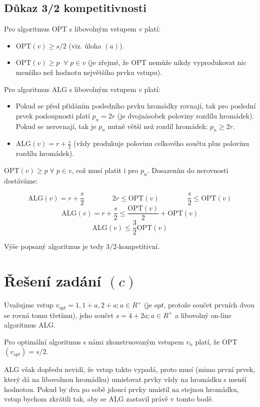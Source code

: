 \documentclass[a4paper, 12pt]{article}
\begin{document}
  \subsection{Důkaz 3/2 kompetitivnosti}
  Pro algoritmus OPT s libovolným vstupem $v$ platí:
  \begin{itemize}
    \item OPT$(v) \ge s/2$ (viz. úloha $(a)$).
    \item OPT$(v) \ge p \; \; \forall \; p \in v$ (je zřejmé, že OPT nemůže nikdy vyprodukovat nic menšího než hodnotu největšího prvku vstupu).
  \end{itemize}

  Pro algoritmus ALG s libovolným vstupem $v$ platí:
  \begin{itemize}
    \item Pokud se před přidáním posledního prvku hromádky rovnají, tak pro poslední prvek posloupnosti platí $p_n=2r$ (je dvojnásobek poloviny rozdílu hromádek). Pokud se nerovnají, tak je $p_n$ nutně větší než rozdíl hromádek: $p_n \ge 2r$.
    \item ALG$(v)=r+\frac{s}{2}$ (vždy produkuje polovinu celkového součtu plus polovinu rozdílu hromádek).
  \end{itemize}

  OPT$(v) \ge p \; \forall \; p \in v$, což musí platit i pro $p_n$. Dosazením do nerovnosti dostáváme:

  $$\text{ALG}(v)=r+\frac{s}{2} \qquad \qquad 2r \le \text{OPT}(v) \qquad \qquad \frac{s}{2} \le \text{OPT}(v)$$
  $$\text{ALG}(v)=r+\frac{s}{2} \le \frac{\text{OPT}(v)}{2}+\text{OPT}(v)$$
  $$\text{ALG}(v) \le \frac{3}{2}\text{OPT}(v)$$

  Výše popsaný algoritmus je tedy $3/2$-kompetitivní.

  \section{Řešení zadání $(c)$}
  Uvažujme vstup $v_{opt}=1,1+a,2+a; a \in R^+$ (je $opt$, protože součet prvních dvou se rovná tomu třetímu), jeho součet $s=4+2a; a \in R^+$ a libovolný on-line algoritmus ALG.

  Pro optimální algoritmus s námi zkonstruovaným vstupem $v_n$ platí, že OPT$(v_{opt})=s/2$.

  ALG však dopředu nevidí, že vstup takto vypadá, proto musí (mimo první prvek, který dá na libovolnou hromádku) umisťovat prvky vždy na hromádku s menší hodnotou. Pokud by dva po sobě jdoucí prvky umístil na stejnou hromádku, vstup bychom zkrátili tak, aby se ALG zastavil právě v tomto bodě.
\end{document}
